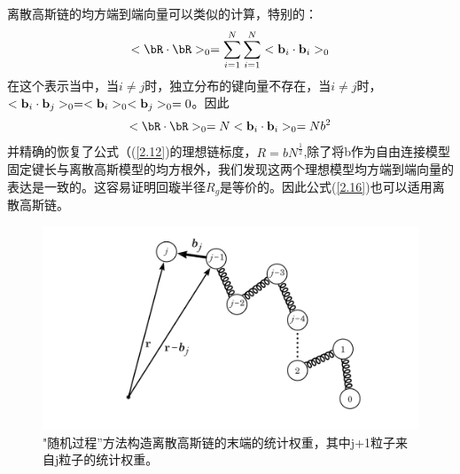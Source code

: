 离散高斯链的均方端到端向量可以类似的计算，特别的：
\begin{equation}\label{2.31}
<\bR\cdot\bR>_{0}=\sum_{i=1}^{N}\sum_{i=1}^{N}<\bb_{i}\cdot\bb_{i}>_{0}
\end{equation}
在这个表示当中，当$i\neq j$时，独立分布的键向量不存在，当$i\neq j$时，$<\mathbf{b}_{i}\cdot\mathbf{b}_{j}>_{0}=<\mathbf{b}_{i}>_{0}<\mathbf{b}_{j}>_{0}=0$。因此
\begin{equation}\label{2.32}
<\bR\cdot\bR>_{0}=N<\bb_{i}\cdot\bb_{i}>_{0}=Nb^2
\end{equation}
并精确的恢复了公式（(\ref{2.12})的理想链标度，$R=bN^\frac{1}{2}$,除了将b作为自由连接模型固定键长与离散高斯模型的均方根外，我们发现这两个理想模型均方端到端向量的表达是一致的。这容易证明回璇半径$R_{g}$是等价的。因此公式(\ref{2.16})也可以适用离散高斯链。
\begin{figure}[H]
\centering
\includegraphics[width=15cm]{./figures/23.png}
\caption{"随机过程”方法构造离散高斯链的末端的统计权重，其中j+1粒子来自j粒子的统计权重。}
\label{figures23}
\end{figure}


